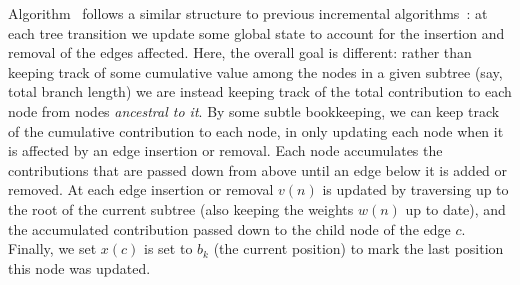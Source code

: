 



Algorithm~ follows a similar structure to previous incremental 
algorithms~\citep{kelleher2016efficient,ralph2020efficiently}:
at each tree transition we update some global state to account for the 
insertion and removal of the edges affected. Here, the overall 
goal is different: rather than keeping track of some cumulative value
among the nodes in a given subtree (say, total branch length) we are instead
keeping track of the total contribution to each node from nodes
\emph{ancestral to it}.
By some subtle bookkeeping, we can keep track of the cumulative 
contribution to each node, in only updating each node when 
it is affected by an edge insertion or removal.
Each node accumulates the contributions that are passed down from above
until an edge below it is added or removed.
At each edge insertion or removal $v(n)$ is updated by traversing up
to the root of the current subtree (also keeping the weights $w(n)$
up to date), and the accumulated 
contribution passed down to the child node of the edge $c$.
Finally, we set $x(c)$ is set to $b_k$ (the current position) to mark
the last position this node was updated.

